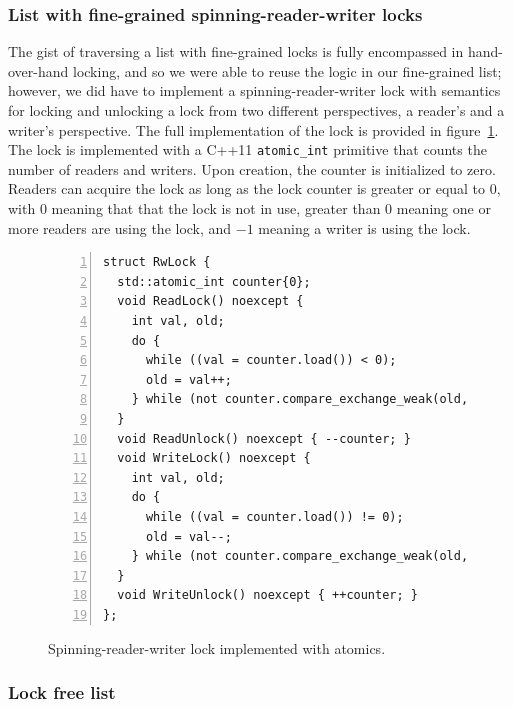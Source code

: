 \documentclass[11pt]{article}
\begin{document}
\subsubsection{List with fine-grained spinning-reader-writer locks}
The gist of traversing a list with fine-grained locks is fully encompassed in
hand-over-hand locking, and so we were able to reuse the logic in our
fine-grained list; however, we did have to implement a spinning-reader-writer
lock with semantics for locking and unlocking a lock from two different
perspectives, a reader's and a writer's perspective. The full implementation of
the lock is provided in figure~\ref{fig:rwlock}. The lock is implemented with a
C++11 {\tt atomic\_int} primitive that counts the number of readers and writers.
Upon creation, the counter is initialized to zero. Readers can acquire the lock
as long as the lock counter is greater or equal to $0$, with $0$ meaning that
that the lock is not in use, greater than $0$ meaning one or more readers are
using the lock, and $-1$ meaning a writer is using the lock.

\begin{figure}[h]
\begin{center}
\begin{lstlisting}[numbers=left]
struct RwLock {
  std::atomic_int counter{0};
  void ReadLock() noexcept {
    int val, old;
    do {
      while ((val = counter.load()) < 0);
      old = val++;
    } while (not counter.compare_exchange_weak(old, val));
  }
  void ReadUnlock() noexcept { --counter; }
  void WriteLock() noexcept {
    int val, old;
    do {
      while ((val = counter.load()) != 0);
      old = val--;
    } while (not counter.compare_exchange_weak(old, val));
  }
  void WriteUnlock() noexcept { ++counter; }
};
\end{lstlisting}
\caption{Spinning-reader-writer lock implemented with atomics.}
\label{fig:rwlock}
\end{center}
\end{figure}

\subsubsection{Lock free list}
\end{document}
